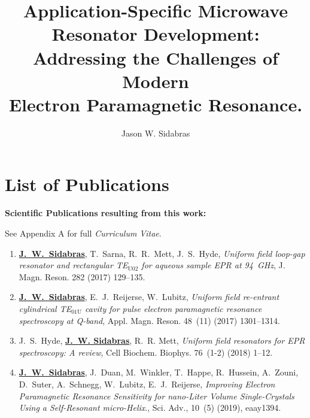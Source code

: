 \documentclass[11pt,a4paper,openany,twoside,english,titlepage=true]{scrbook}
\author{Jason W. Sidabras}
\title{\textbf{Application-Specific Microwave Resonator Development:} \\ Addressing the Challenges of Modern \\ Electron Paramagnetic Resonance.}
\begin{document}
\raggedbottom
{}

\maketitle






\newpage

\chapter*{List of Publications}

\textbf{Scientific Publications resulting from this work: }

See Appendix A for full \textit{Curriculum Vitae}.
\begin{enumerate}
\itemsep0em
    \item \textbf{\underline{J.~W.~Sidabras}}, T.~Sarna, R.~R.~Mett, J.~S.~Hyde, {\em Uniform field loop-gap
  resonator and rectangular {TE}$_{\text{{U}02}}$ for aqueous sample {EPR} at 94~{GHz}}, J. Magn. Reson. 282 (2017) 129--135.
    \item \textbf{\underline{J.~W.~Sidabras}}, E.~J.~Reijerse, W.~Lubitz, {\em Uniform field re-entrant cylindrical
  {TE}$_{\text{01{U}}}$ cavity for pulse electron paramagnetic resonance spectroscopy at {Q}-band}, Appl. Magn. Reson. 48~(11) (2017) 1301--1314.
    \item J.~S.~Hyde, \textbf{\underline{J.~W. Sidabras}}, R.~R. Mett, {\em Uniform field resonators for {EPR}
  spectroscopy: A review}, Cell Biochem. Biophys. 76~(1-2) (2018) 1--12.
    \item \textbf{\underline{J.~W.~Sidabras}}, J.~Duan, M.~Winkler, T.~Happe, R.~Hussein, A.~Zouni, D.~Suter,
  A.~Schnegg, W.~Lubitz, E.~J.~Reijerse, {\em Improving Electron Paramagnetic Resonance Sensitivity for nano-Liter Volume Single-Crystals Using a Self-Resonant micro-Helix}., Sci. Adv., 10~(5) (2019), eaay1394.
\end{enumerate}

\newpage
\makeatletter
\renewcommand{\@pnumwidth}{1.75em} 
\renewcommand{\@tocrmarg}{2em}
\makeatother
\tableofcontents\newpage
\end{document}
